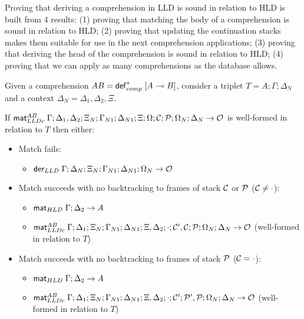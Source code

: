 
Proving that deriving a comprehension in LLD is sound in relation to HLD is
built from 4 results: (1) proving that matching the body of a comprehension is
sound in relation to HLD; (2) proving that updating the continuation stacks
makes them suitable for use in the next comprehension applications; (3) proving
that deriving the head of the comprehension is sound in relation to HLD; (4)
proving that we can apply as many comprehensions as the database allows.

\begin{lemma}\label{thm:comprehension_body_match}
Given a comprehension $AB = \mathsf{def}_{comp}^{*} \; [A \multimap B]$, consider a triplet $T = A; \Gamma;
\Delta_{N}$ and a context $\Delta_{N} = \Delta_1, \Delta_2, \Xi$.

If $\mathsf{mat}_{LLDc}^{AB} \; \Gamma; \Delta_1, \Delta_2; \Xi_N; \Gamma_{N1}; \Delta_{N1}; \Xi;
\Omega; \mathcal{C}; \mathcal{P}; \Omega_N; \Delta_N \rightarrow \mathcal{O}$ is
well-formed in relation to $T$ then either:

\begin{itemize}[leftmargin=*]
   \item Match fails:
   \begin{itemize}[leftmargin=\secondm]
      \item $\mathsf{der}_{LLD} \; \Gamma; \Delta_N; \Xi_N; \Gamma_{N1}; \Delta_{N1}; \Omega_N \rightarrow \mathcal{O}$
   \end{itemize}
   
   \item Match succeeds with no backtracking to frames of stack $\mathcal{C}$ or
   $\mathcal{P}$ ($\mathcal{C} \neq \cdot$):

   \begin{itemize}[leftmargin=\secondm]
      \item $\mathsf{mat}_{HLD} \; \Gamma; \Delta_2 \rightarrow A$
      \item $\mathsf{mat}_{LLDc}^{AB} \; \Gamma; \Delta_1; \Xi_N; \Gamma_{N1}; \Delta_{N1}; \Xi,
         \Delta_2; \cdot; \mathcal{C'}, \mathcal{C}; \mathcal{P}; \Omega_N; \Delta_N
         \rightarrow \mathcal{O}$ (well-formed in relation to $T$)
   \end{itemize}

   \item Match succeeds with no backtracking to frames of stack $\mathcal{P}$ ($\mathcal{C} =
         \cdot$):
   \begin{itemize}[leftmargin=\secondm]
      \item $\mathsf{mat}_{HLD} \; \Gamma; \Delta_2 \rightarrow A$
      \item $\mathsf{mat}_{LLDc}^{AB} \; \Gamma; \Delta_1; \Xi_N; \Gamma_{N1}; \Delta_{N1}; \Xi,
         \Delta_2; \cdot; \mathcal{C'}; \mathcal{P'}, \mathcal{P}; \Omega_N; \Delta_N
         \rightarrow \mathcal{O}$ (well-formed in relation to $T$)
   \end{itemize}


\end{itemize}
\end{lemma}

